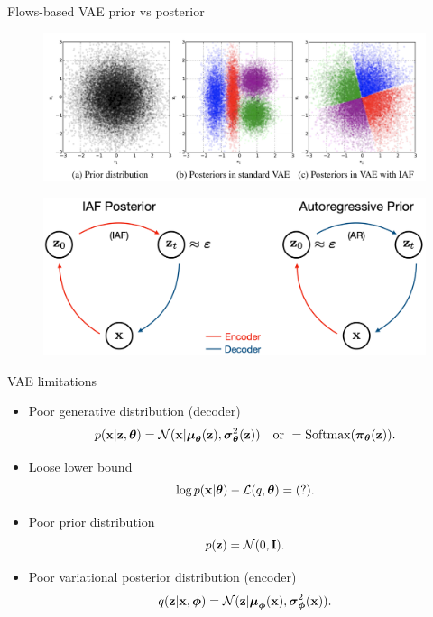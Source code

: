 \begin{frame}{Flows-based VAE prior vs posterior}
	\vspace{-0.2cm}
	\begin{figure}
		\includegraphics[width=0.9\linewidth]{figs/iaf1.png}
	\end{figure}
	\vspace{-0.3cm}
	\begin{figure}
		\includegraphics[width=0.65\linewidth]{figs/prior_vs_posterior}
	\end{figure}
	
\end{frame}
\begin{frame}{VAE limitations}
	\begin{itemize}
		\item Poor generative distribution (decoder)
		\[
		p(\mathbf{x} | \mathbf{z}, \boldsymbol{\theta}) = \mathcal{N}(\mathbf{x}| \boldsymbol{\mu}_{\boldsymbol{\theta}}(\mathbf{z}), \boldsymbol{\sigma}^2_{\boldsymbol{\theta}}(\mathbf{z})) \quad \text{or } = \text{Softmax}(\boldsymbol{\pi}_{\boldsymbol{\theta}}(\mathbf{z})).
		\]
		\item Loose lower bound
		\[
		\log p(\mathbf{x} | \boldsymbol{\theta}) - \mathcal{L}(q, \boldsymbol{\theta}) = (?).
		\]
		\item Poor prior distribution
		\[
		p(\mathbf{z}) = \mathcal{N}(0, \mathbf{I}).
		\]
		\item Poor variational posterior distribution (encoder)
		\[
		q(\mathbf{z} | \mathbf{x}, \boldsymbol{\phi}) = \mathcal{N}(\mathbf{z}| \boldsymbol{\mu}_{\boldsymbol{\phi}}(\mathbf{x}), \boldsymbol{\sigma}^2_{\boldsymbol{\phi}}(\mathbf{x})).
		\]
	\end{itemize}
\end{frame}
